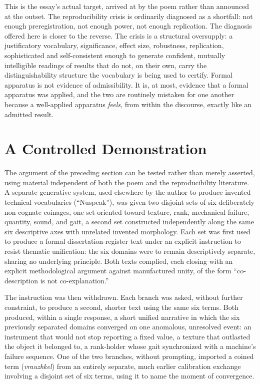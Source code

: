\documentclass[11pt]{article}
\begin{document}
This is the essay's actual target, arrived at by the poem rather than announced at the outset. The reproducibility crisis is ordinarily diagnosed as a shortfall: not enough preregistration, not enough power, not enough replication. The diagnosis offered here is closer to the reverse. The crisis is a structural oversupply: a justificatory vocabulary, significance, effect size, robustness, replication, sophisticated and self-consistent enough to generate confident, mutually intelligible readings of results that do not, on their own, carry the distinguishability structure the vocabulary is being used to certify. Formal apparatus is not evidence of admissibility. It is, at most, evidence that a formal apparatus was applied, and the two are routinely mistaken for one another because a well-applied apparatus \emph{feels}, from within the discourse, exactly like an admitted result.

\section{A Controlled Demonstration}

The argument of the preceding section can be tested rather than merely asserted, using material independent of both the poem and the reproducibility literature. A separate generative system, used elsewhere by the author to produce invented technical vocabularies (``Nuspeak''), was given two disjoint sets of six deliberately non-cognate coinages, one set oriented toward texture, rank, mechanical failure, quantity, sound, and gait, a second set constructed independently along the same six descriptive axes with unrelated invented morphology. Each set was first used to produce a formal dissertation-register text under an explicit instruction to resist thematic unification: the six domains were to remain descriptively separate, sharing no underlying principle. Both texts complied, each closing with an explicit methodological argument against manufactured unity, of the form ``co-description is not co-explanation.''

The instruction was then withdrawn. Each branch was asked, without further constraint, to produce a second, shorter text using the same six terms. Both produced, within a single response, a short unified narrative in which the six previously separated domains converged on one anomalous, unresolved event: an instrument that would not stop reporting a fixed value, a texture that outlasted the object it belonged to, a rank-holder whose gait synchronized with a machine's failure sequence. One of the two branches, without prompting, imported a coined term (\emph{vrauzhkel}) from an entirely separate, much earlier calibration exchange involving a disjoint set of six terms, using it to name the moment of convergence.
\end{document}

